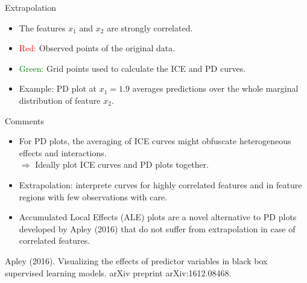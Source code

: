 \documentclass[11pt,compress,t,notes=noshow, xcolor=table]{beamer}
\begin{document}
\begin{vbframe}{Extrapolation}
\begin{itemize}
\item The features $x_1$ and $x_2$ are strongly correlated.
\item \textcolor{red}{Red:} Observed points of the original data.
\item \textcolor{green}{Green:} Grid points used to calculate the ICE and PD curves.
\item Example: PD plot at $x_1=1.9$ averages predictions over the whole marginal distribution of feature $x_2$.
\end{itemize}
\end{vbframe}

\begin{vbframe}{Comments}
\begin{itemize}
  \item For PD plots, the averaging of ICE curves might obfuscate heterogeneous effects and interactions. \\
  $\Rightarrow$ Ideally plot ICE curves and PD plots together.
%
%
%
%
\item Extrapolation: interprete curves for highly correlated features and in feature regions with few observations with care.
\item Accumulated Local Effects (ALE) plots are a novel alternative to PD plots developed by Apley (2016) that do not suffer from extrapolation in case of correlated features.
\end{itemize}

\vspace{2cm}
\vfill\tiny
Apley (2016).
Visualizing the effects of predictor variables in black box supervised learning models.
arXiv preprint arXiv:1612.08468.

\end{vbframe}


\endlecture
\end{document}
